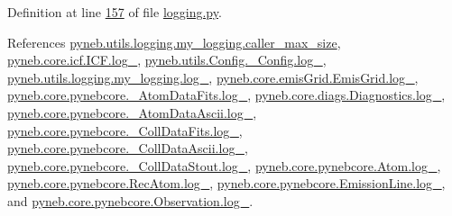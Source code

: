 Definition at line \hyperlink{logging_8py_source_l00157}{157} of file \hyperlink{logging_8py_source}{logging.\-py}.



References \hyperlink{logging_8py_source_l00040}{pyneb.\-utils.\-logging.\-my\-\_\-logging.\-caller\-\_\-max\-\_\-size}, \hyperlink{icf_8py_source_l00015}{pyneb.\-core.\-icf.\-I\-C\-F.\-log\-\_\-}, \hyperlink{_config_8py_source_l00031}{pyneb.\-utils.\-Config.\-\_\-\-Config.\-log\-\_\-}, \hyperlink{logging_8py_source_l00033}{pyneb.\-utils.\-logging.\-my\-\_\-logging.\-log\-\_\-}, \hyperlink{emis_grid_8py_source_l00043}{pyneb.\-core.\-emis\-Grid.\-Emis\-Grid.\-log\-\_\-}, \hyperlink{pynebcore_8py_source_l00087}{pyneb.\-core.\-pynebcore.\-\_\-\-Atom\-Data\-Fits.\-log\-\_\-}, \hyperlink{diags_8py_source_l00168}{pyneb.\-core.\-diags.\-Diagnostics.\-log\-\_\-}, \hyperlink{pynebcore_8py_source_l00308}{pyneb.\-core.\-pynebcore.\-\_\-\-Atom\-Data\-Ascii.\-log\-\_\-}, \hyperlink{pynebcore_8py_source_l00574}{pyneb.\-core.\-pynebcore.\-\_\-\-Coll\-Data\-Fits.\-log\-\_\-}, \hyperlink{pynebcore_8py_source_l00923}{pyneb.\-core.\-pynebcore.\-\_\-\-Coll\-Data\-Ascii.\-log\-\_\-}, \hyperlink{pynebcore_8py_source_l01155}{pyneb.\-core.\-pynebcore.\-\_\-\-Coll\-Data\-Stout.\-log\-\_\-}, \hyperlink{pynebcore_8py_source_l01216}{pyneb.\-core.\-pynebcore.\-Atom.\-log\-\_\-}, \hyperlink{pynebcore_8py_source_l02633}{pyneb.\-core.\-pynebcore.\-Rec\-Atom.\-log\-\_\-}, \hyperlink{pynebcore_8py_source_l03384}{pyneb.\-core.\-pynebcore.\-Emission\-Line.\-log\-\_\-}, and \hyperlink{pynebcore_8py_source_l03540}{pyneb.\-core.\-pynebcore.\-Observation.\-log\-\_\-}.


